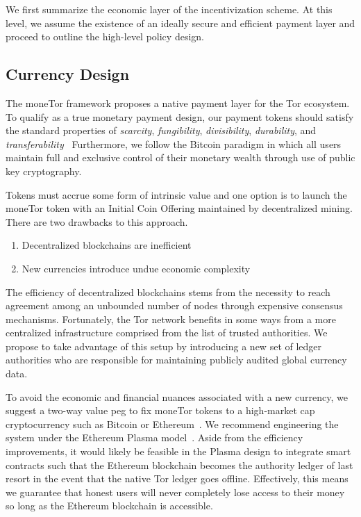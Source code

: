 We first summarize the economic layer of the incentivization scheme. At this
level, we assume the existence of an ideally secure and efficient payment layer
and proceed to outline the high-level policy design.

\subsection{Currency Design}

The moneTor framework proposes a native payment layer for the Tor ecosystem. To
qualify as a true monetary payment design, our payment tokens should satisfy the
standard properties of \textit{scarcity}, \textit{fungibility},
\textit{divisibility}, \textit{durability}, and
\textit{transferability}~\cite[p.3]{crump2011phenomenon} Furthermore, we follow
the Bitcoin paradigm in which all users maintain full and exclusive control of
their monetary wealth through use of public key cryptography.

Tokens must accrue some form of intrinsic value and one option is to launch the
moneTor token with an Initial Coin Offering maintained by decentralized mining. There are two drawbacks to this approach.

\begin{enumerate}
\item Decentralized blockchains are inefficient
\item New currencies introduce undue economic complexity
\end{enumerate}

The efficiency of decentralized blockchains stems from the necessity to reach
agreement among an unbounded number of nodes through expensive consensus
mechanisms. Fortunately, the Tor network benefits in some ways from a more
centralized infrastructure comprised from the list of trusted authorities. We
propose to take advantage of this setup by introducing a new set of ledger
authorities who are responsible for maintaining publicly audited global
currency data.

To avoid the economic and financial nuances associated with a new currency, we
suggest a two-way value peg to fix moneTor tokens to a high-market cap
cryptocurrency such as Bitcoin or Ethereum~\cite{back2014enabling,
  poon2017plasma}. We recommend engineering the system under the Ethereum Plasma
model~\cite{poon2017plasma}. Aside from the efficiency improvements, it would
likely be feasible in the Plasma design to integrate smart contracts such that
the Ethereum blockchain becomes the authority ledger of last resort in the event
that the native Tor ledger goes offline. Effectively, this means we guarantee
that honest users will never completely lose access to their money so long as
the Ethereum blockchain is accessible.

